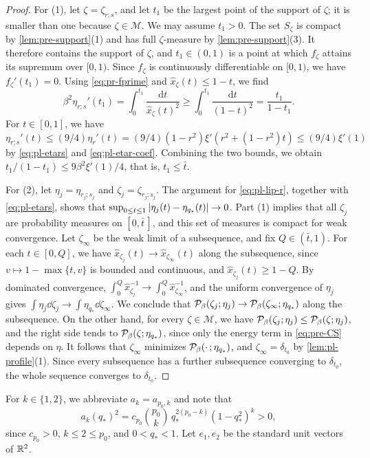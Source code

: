 \begin{proof}
For (1), let $\zeta=\zeta_{r;s}$, and let $t_1$ be the largest point of the support of $\zeta$; it is smaller than one because $\zeta\in\mathscr M$. We may assume $t_1>0$. The set $S_\zeta$ is compact by \cref{lem:pre-support}(1) and has full $\zeta$-measure by \cref{lem:pre-support}(3). It therefore contains the support of $\zeta$, and $t_1\in(0,1)$ is a point at which $f_\zeta$ attains its supremum over $[0,1)$. Since $f_\zeta$ is continuously differentiable on $[0,1)$, we have $f_\zeta'(t_1)=0$. Using \eqref{eq:pr-fprime} and $\hat x_\zeta(t)\le1-t$, we find
\[
\beta^2\eta_{r;s}'(t_1)=\int_0^{t_1}\frac{\mathrm dt}{\hat x_\zeta(t)^2}\ge\int_0^{t_1}\frac{\mathrm dt}{(1-t)^2}=\frac{t_1}{1-t_1}.
\]
For $t\in[0,1]$, we have $\eta_{r;s}'(t)\le(9/4)\eta_r'(t)=(9/4)(1-r^2)\xi'(r^2+(1-r^2)t)\le(9/4)\xi'(1)$ by \eqref{eq:pl-etars} and \eqref{eq:pl-etar-coef}. Combining the two bounds, we obtain $t_1/(1-t_1)\le9\beta^2\xi'(1)/4$, that is, $t_1\le\bar t$.

For (2), let $\eta_j=\eta_{r_j;s_j}$ and $\zeta_j=\zeta_{r_j;s_j}$. The argument for \eqref{eq:pl-lip-r}, together with \eqref{eq:pl-etars}, shows that $\sup_{0\le t\le1}\left|\eta_j(t)-\eta_{q_*}(t)\right|\to0$. Part (1) implies that all $\zeta_j$ are probability measures on $[0,\bar t\,]$, and this set of measures is compact for weak convergence. Let $\zeta_\infty$ be the weak limit of a subsequence, and fix $Q\in(\bar t,1)$. For each $t\in[0,Q]$, we have $\hat x_{\zeta_j}(t)\to\hat x_{\zeta_\infty}(t)$ along the subsequence, since $v\mapsto1-\max\{t,v\}$ is bounded and continuous, and $\hat x_{\zeta_j}(t)\ge1-Q$. By dominated convergence, $\int_0^Q\hat x_{\zeta_j}^{-1}\to\int_0^Q\hat x_{\zeta_\infty}^{-1}$, and the uniform convergence of $\eta_j$ gives $\int\eta_j\dd\zeta_j\to\int\eta_{q_*}\dd\zeta_\infty$. We conclude that $\mathcal P_\beta(\zeta_j;\eta_j)\to\mathcal P_\beta(\zeta_\infty;\eta_{q_*})$ along the subsequence. On the other hand, for every $\zeta\in\mathscr M$, we have $\mathcal P_\beta(\zeta_j;\eta_j)\le\mathcal P_\beta(\zeta;\eta_j)$, and the right side tends to $\mathcal P_\beta(\zeta;\eta_{q_*})$, since only the energy term in \eqref{eq:pre-CS} depends on $\eta$. It follows that $\zeta_\infty$ minimizes $\mathcal P_\beta(\cdot\,;\eta_{q_*})$, and $\zeta_\infty=\delta_{t_0}$ by \cref{lem:pl-profile}(1). Since every subsequence has a further subsequence converging to $\delta_{t_0}$, the whole sequence converges to $\delta_{t_0}$.
\end{proof}

For $k\in\{1,2\}$, we abbreviate $a_k=a_{p_0,k}$ and note that
\begin{equation}\label{eq:pl-ak}
a_k(q_*)^2=c_{p_0}\binom{p_0}k\,q_*^{2(p_0-k)}(1-q_*^2)^k>0,
\end{equation}
since $c_{p_0}>0$, $k\le2\le p_0$, and $0<q_*<1$. Let $e_1,e_2$ be the standard unit vectors of $\mathbb R^2$.

